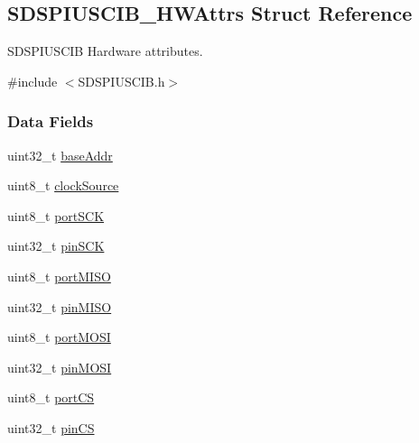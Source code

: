 \subsection{S\-D\-S\-P\-I\-U\-S\-C\-I\-B\-\_\-\-H\-W\-Attrs Struct Reference}
\label{struct_s_d_s_p_i_u_s_c_i_b___h_w_attrs}


S\-D\-S\-P\-I\-U\-S\-C\-I\-B Hardware attributes.  




{\ttfamily \#include $<$S\-D\-S\-P\-I\-U\-S\-C\-I\-B.\-h$>$}

\subsubsection*{Data Fields}
\begin{DoxyCompactItemize}
\item 
uint32\-\_\-t \hyperlink{struct_s_d_s_p_i_u_s_c_i_b___h_w_attrs_a79abe50fce2806f87a163d6f23a84bfc}{base\-Addr}
\item 
uint8\-\_\-t \hyperlink{struct_s_d_s_p_i_u_s_c_i_b___h_w_attrs_aa8f43f1ca5d5e37adcb870159bc53b51}{clock\-Source}
\item 
uint8\-\_\-t \hyperlink{struct_s_d_s_p_i_u_s_c_i_b___h_w_attrs_a9b770a9872ac79e5378787fa387abdb4}{port\-S\-C\-K}
\item 
uint32\-\_\-t \hyperlink{struct_s_d_s_p_i_u_s_c_i_b___h_w_attrs_a323d54fd5aa69f99cdc6a4b3feacaec4}{pin\-S\-C\-K}
\item 
uint8\-\_\-t \hyperlink{struct_s_d_s_p_i_u_s_c_i_b___h_w_attrs_a112c64aa057c1a0a33091ac5b79f0cdd}{port\-M\-I\-S\-O}
\item 
uint32\-\_\-t \hyperlink{struct_s_d_s_p_i_u_s_c_i_b___h_w_attrs_ade4c404a00f7c78c8e957f03c0f14c28}{pin\-M\-I\-S\-O}
\item 
uint8\-\_\-t \hyperlink{struct_s_d_s_p_i_u_s_c_i_b___h_w_attrs_ab78bc489ab2a35be42262b06d168ca94}{port\-M\-O\-S\-I}
\item 
uint32\-\_\-t \hyperlink{struct_s_d_s_p_i_u_s_c_i_b___h_w_attrs_ac494dc6eb480b4010f5dbfb086bb4800}{pin\-M\-O\-S\-I}
\item 
uint8\-\_\-t \hyperlink{struct_s_d_s_p_i_u_s_c_i_b___h_w_attrs_a0129b7fe4659c981ba8f10972587f845}{port\-C\-S}
\item 
uint32\-\_\-t \hyperlink{struct_s_d_s_p_i_u_s_c_i_b___h_w_attrs_a3afe9dbe3f17c8dbb9994eb936e57db1}{pin\-C\-S}
\end{DoxyCompactItemize}


